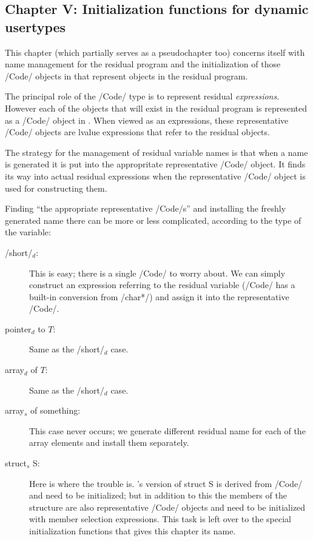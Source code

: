 \begin{docpart}
\subsection{Chapter V: Initialization functions for dynamic usertypes}
\label{sec:gegen:InitializationFunctionsForDynamicUsertypes}
This chapter (which partially serves as a pseudochapter too) concerns
itself with name management for the residual program and the
initialization of those /Code/ objects in \Pgen{} that represent
objects in the residual program.

The principal role of the /Code/ type is to represent residual
\emph{expressions}. However each of the objects that will exist in the
residual program is represented as a /Code/ object in \Pgen{}. When
viewed as an expressions, these representative /Code/ objects are
lvalue expressions that refer to the residual objects.

The strategy for the management of residual variable names is that
when a name is generated it is put into the appropritate
representative /Code/ object. It finds its way into actual residual
expressions when the representative /Code/ object is used for
constructing them.

Finding ``the appropriate representative /Code/s'' and installing the
freshly generated name
there can be more or less complicated, according to the type of the
variable:
\begin{description}
\item[/short/$_d$:] This is easy; there is a single /Code/ to worry
about. We can simply construct an expression referring to the residual
variable (/Code/ has a built-in conversion from /char*/) and assign
it into the representative /Code/.
\item[pointer$_d$ to $T$:] Same as the /short/$_d$ case.
\item[array$_d$ of $T$:] Same as the /short/$_d$ case.
\item[array$_s$ of something:] This case never occurs; we generate
different residual name for each of the array elements and install
them separately.
\item[struct$_s$ S:] Here is where the trouble is. \Pgen's version of
struct S is derived from /Code/ and need to be initialized; but in
addition to this the members of the structure are also representative
/Code/ objects and need to be initialized with member selection
expressions. This task is left over to the special initialization
functions that gives this chapter its name.
\end{description}


\end{docpart}
